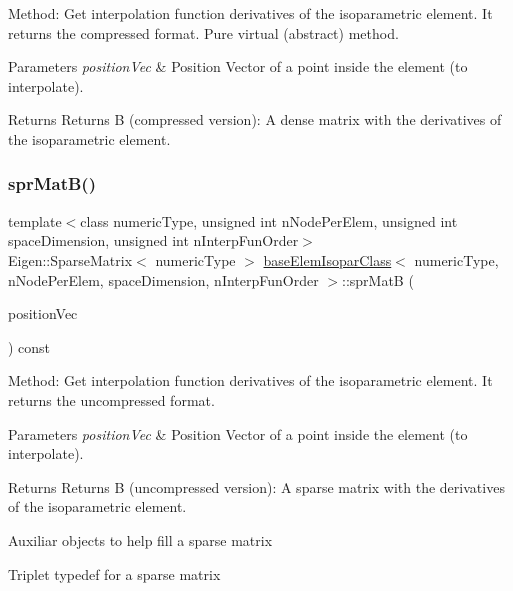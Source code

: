 Method\+: Get interpolation function derivatives of the isoparametric element. It returns the compressed format. Pure virtual (abstract) method. 
\begin{DoxyParams}{Parameters}
{\em position\+Vec} & Position Vector of a point inside the element (to interpolate). \\
\hline
\end{DoxyParams}
\begin{DoxyReturn}{Returns}
Returns B (compressed version)\+: A dense matrix with the derivatives of the isoparametric element. 
\end{DoxyReturn}
\mbox{\label{classbase_elem_isopar_class_a483a72ba8c1ec6c79d1b7cd6a8f8d895}} 
\subsubsection{\texorpdfstring{spr\+Mat\+B()}{sprMatB()}}
{\footnotesize\ttfamily template$<$class numeric\+Type, unsigned int n\+Node\+Per\+Elem, unsigned int space\+Dimension, unsigned int n\+Interp\+Fun\+Order$>$ \\
Eigen\+::\+Sparse\+Matrix$<$ numeric\+Type $>$ \mbox{\hyperlink{classbase_elem_isopar_class}{base\+Elem\+Isopar\+Class}}$<$ numeric\+Type, n\+Node\+Per\+Elem, space\+Dimension, n\+Interp\+Fun\+Order $>$\+::spr\+MatB (\begin{DoxyParamCaption}\item[{const Matrix$<$ numeric\+Type, space\+Dimension, 1 $>$ \&}]{position\+Vec }\end{DoxyParamCaption}) const}

Method\+: Get interpolation function derivatives of the isoparametric element. It returns the uncompressed format. 
\begin{DoxyParams}{Parameters}
{\em position\+Vec} & Position Vector of a point inside the element (to interpolate). \\
\hline
\end{DoxyParams}
\begin{DoxyReturn}{Returns}
Returns B (uncompressed version)\+: A sparse matrix with the derivatives of the isoparametric element. 
\end{DoxyReturn}
Auxiliar objects to help fill a sparse matrix

Triplet typedef for a sparse matrix

